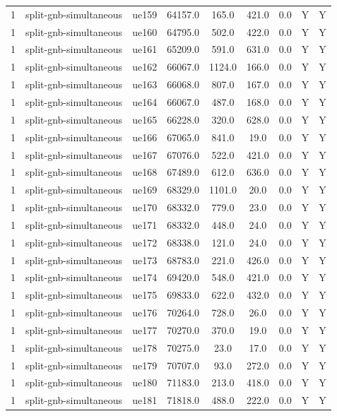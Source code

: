\begin{table}[ht]
\begin{tabular}{|c|c|c|c|c|c|c|c|c|}
1 & split-gnb-simultaneous & ue159 & 64157.0 & 165.0 & 421.0 & 0.0 & Y & Y \\
1 & split-gnb-simultaneous & ue160 & 64795.0 & 502.0 & 422.0 & 0.0 & Y & Y \\
1 & split-gnb-simultaneous & ue161 & 65209.0 & 591.0 & 631.0 & 0.0 & Y & Y \\
1 & split-gnb-simultaneous & ue162 & 66067.0 & 1124.0 & 166.0 & 0.0 & Y & Y \\
1 & split-gnb-simultaneous & ue163 & 66068.0 & 807.0 & 167.0 & 0.0 & Y & Y \\
1 & split-gnb-simultaneous & ue164 & 66067.0 & 487.0 & 168.0 & 0.0 & Y & Y \\
1 & split-gnb-simultaneous & ue165 & 66228.0 & 320.0 & 628.0 & 0.0 & Y & Y \\
1 & split-gnb-simultaneous & ue166 & 67065.0 & 841.0 & 19.0 & 0.0 & Y & Y \\
1 & split-gnb-simultaneous & ue167 & 67076.0 & 522.0 & 421.0 & 0.0 & Y & Y \\
1 & split-gnb-simultaneous & ue168 & 67489.0 & 612.0 & 636.0 & 0.0 & Y & Y \\
1 & split-gnb-simultaneous & ue169 & 68329.0 & 1101.0 & 20.0 & 0.0 & Y & Y \\
1 & split-gnb-simultaneous & ue170 & 68332.0 & 779.0 & 23.0 & 0.0 & Y & Y \\
1 & split-gnb-simultaneous & ue171 & 68332.0 & 448.0 & 24.0 & 0.0 & Y & Y \\
1 & split-gnb-simultaneous & ue172 & 68338.0 & 121.0 & 24.0 & 0.0 & Y & Y \\
1 & split-gnb-simultaneous & ue173 & 68783.0 & 221.0 & 426.0 & 0.0 & Y & Y \\
1 & split-gnb-simultaneous & ue174 & 69420.0 & 548.0 & 421.0 & 0.0 & Y & Y \\
1 & split-gnb-simultaneous & ue175 & 69833.0 & 622.0 & 432.0 & 0.0 & Y & Y \\
1 & split-gnb-simultaneous & ue176 & 70264.0 & 728.0 & 26.0 & 0.0 & Y & Y \\
1 & split-gnb-simultaneous & ue177 & 70270.0 & 370.0 & 19.0 & 0.0 & Y & Y \\
1 & split-gnb-simultaneous & ue178 & 70275.0 & 23.0 & 17.0 & 0.0 & Y & Y \\
1 & split-gnb-simultaneous & ue179 & 70707.0 & 93.0 & 272.0 & 0.0 & Y & Y \\
1 & split-gnb-simultaneous & ue180 & 71183.0 & 213.0 & 418.0 & 0.0 & Y & Y \\
1 & split-gnb-simultaneous & ue181 & 71818.0 & 488.0 & 222.0 & 0.0 & Y & Y \\

\end{tabular}
\end{table}
